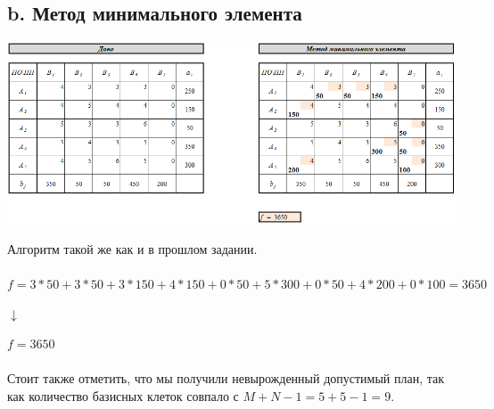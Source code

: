 \documentclass[14pt,a4paper,fleqn]{extarticle}
\begin{document}
\subsection*{b. Метод минимального элемента}
\begin{center}
	\includegraphics[scale=0.51]{23}
\end{center}
Алгоритм такой же как и в прошлом задании.\\\\
\small $f = 3*50+3*50+3*150+4*150+0*50+5*300+0*50+4*200+0*100 = 3650$
\begin{center}
	$\downarrow$
\end{center}
$f = 3650$\\\\
Стоит также отметить, что мы получили невырожденный допустимый план, так как количество базисных клеток совпало с $M+N-1 = 5+5-1 = 9$.
\newpage
\end{document}
